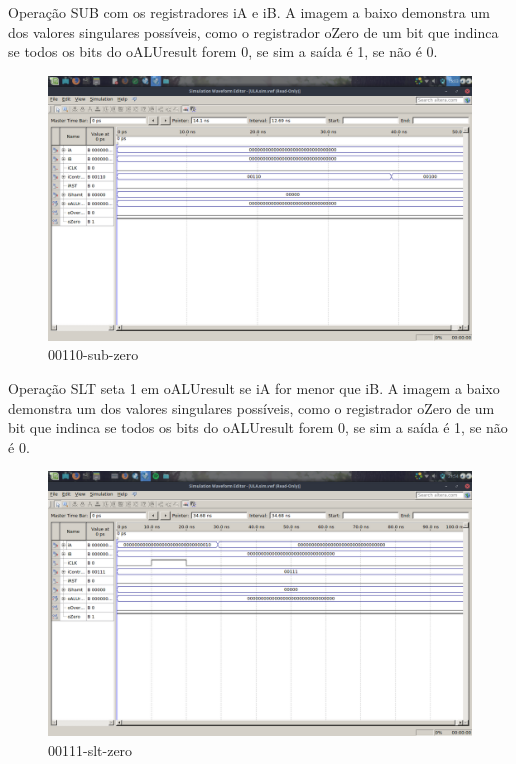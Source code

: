 \documentclass[12pt]{article}
\begin{document}
Operação SUB com os registradores iA e iB.
A imagem a baixo demonstra um dos valores singulares possíveis, como o registrador oZero de um bit que indinca se todos os bits do oALUresult forem 0, se sim a saída é 1, se não é 0.
\begin{figure}[H]
	\centering
	\includegraphics[width=.8\textwidth]{00110-sub-zero.png}
	\caption{00110-sub-zero}
	\label{fig:00110-sub-zero}
\end{figure}

Operação SLT seta 1 em oALUresult se iA for menor que iB.
A imagem a baixo demonstra um dos valores singulares possíveis, como o registrador oZero de um bit que indinca se todos os bits do oALUresult forem 0, se sim a saída é 1, se não é 0.
\begin{figure}[H]
	\centering
	\includegraphics[width=.8\textwidth]{00111-slt-zero.png}
	\caption{00111-slt-zero}
	\label{fig:00111-slt-zero}
\end{figure}
\end{document}
